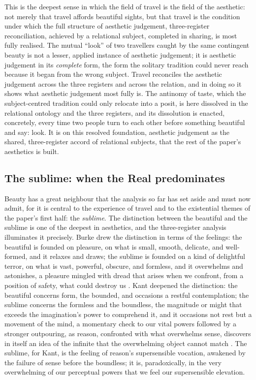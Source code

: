 This is the deepest sense in which the field of travel is the field of the aesthetic: not merely that travel affords beautiful sights, but that travel is the condition under which the full structure of aesthetic judgement, three-register reconciliation, achieved by a relational subject, completed in sharing, is most fully realised. The mutual ``look'' of two travellers caught by the same contingent beauty is not a lesser, applied instance of aesthetic judgement; it is aesthetic judgement in its \emph{complete} form, the form the solitary tradition could never reach because it began from the wrong subject. Travel reconciles the aesthetic judgement across the three registers and across the relation, and in doing so it shows what aesthetic judgement most fully is. The antinomy of taste, which the subject-centred tradition could only relocate into a posit, is here dissolved in the relational ontology and the three registers, and its dissolution is enacted, concretely, every time two people turn to each other before something beautiful and say: look. It is on this resolved foundation, aesthetic judgement as the shared, three-register accord of relational subjects, that the rest of the paper's aesthetics is built.

\subsection{The sublime: when the Real predominates}
\label{p21:sub:ap-sublime}

Beauty has a great neighbour that the analysis so far has set aside and must now admit, for it is central to the experience of travel and to the existential themes of the paper's first half: the \emph{sublime}. The distinction between the beautiful and the sublime is one of the deepest in aesthetics, and the three-register analysis illuminates it precisely. Burke drew the distinction in terms of the feelings: the beautiful is founded on pleasure, on what is small, smooth, delicate, and well-formed, and it relaxes and draws; the sublime is founded on a kind of delightful terror, on what is vast, powerful, obscure, and formless, and it overwhelms and astonishes, a pleasure mingled with dread that arises when we confront, from a position of safety, what could destroy us \parencite{burke1990}. Kant deepened the distinction: the beautiful concerns form, the bounded, and occasions a restful contemplation; the sublime concerns the formless and the boundless, the magnitude or might that exceeds the imagination's power to comprehend it, and it occasions not rest but a movement of the mind, a momentary check to our vital powers followed by a stronger outpouring, as reason, confronted with what overwhelms sense, discovers in itself an idea of the infinite that the overwhelming object cannot match \parencite{kant1987}. The sublime, for Kant, is the feeling of reason's supersensible vocation, awakened by the failure of sense before the boundless; it is, paradoxically, in the very overwhelming of our perceptual powers that we feel our supersensible elevation.

